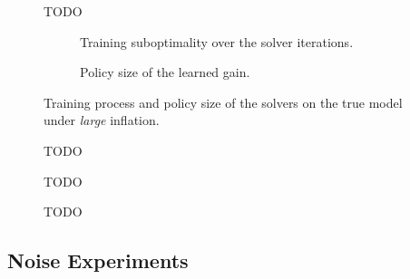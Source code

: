 \begin{figure}[htbp]
  \centering
  \caption{TODO}
  \label{fig:ch4-true-base-subopt}
\end{figure}



\begin{figure}[htbp]
  \centering
  \begin{subfigure}[t]{0.49\linewidth}
    \centering
    \caption{Training suboptimality over the solver iterations.}
    \label{fig:ch4-true-large-curves-iterations}
  \end{subfigure}\hfill
  \begin{subfigure}[t]{0.49\linewidth}
    \centering
    \caption{Policy size of the learned gain.}
    \label{fig:ch4-true-large-complexity}
  \end{subfigure}
  \caption{Training process and policy size of the solvers on the true model under
    \emph{large} inflation.}
  \label{fig:ch4-true-large-training}
\end{figure}

\begin{figure}[htbp]
  \centering
  \caption{TODO}
  \label{fig:ch4-true-large-subopt}
\end{figure}




\begin{figure}[htbp]
  \centering
  \caption{TODO}
  \label{fig:ch4-true-across-sizes-complexity}
\end{figure}

\begin{figure}[htbp]
  \centering
  \caption{TODO}
  \label{fig:ch4-true-across-sizes-subopt}
\end{figure}




\subsection{Noise Experiments}
\label{sec:true-model-noise}


